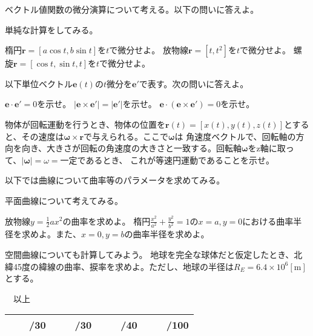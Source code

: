 \documentclass[a4j,dvipdfmx]{jsarticle}
\begin{document}
        ベクトル値関数の微分演算について考える。以下の問いに答えよ。
        \begin{qparts}
            \qpart 単純な計算をしてみる。
            \begin{qlist}
                \qitem 楕円$\bm{r}=[a\cos t,b\sin t]$を$t$で微分せよ。
                \qitem 放物線$\bm{r}=[t,t^2]$を$t$で微分せよ。
                \qitem 螺旋$\bm{r}=[\cos t,\sin t,t]$を$t$で微分せよ。
            \end{qlist}
            \qpart 以下単位ベクトル$\bm{e}(t)$の$t$微分を$\bm{e}'$で表す。次の問いに答えよ。
            \begin{qlist}
                \qitem $\bm{e}\cdot\bm{e}'=0$を示せ。
                \qitem $|\bm{e}\times\bm{e}'|=|\bm{e}'|$を示せ。
                \qitem $\bm{e}\cdot(\bm{e}\times\bm{e}')=0$を示せ。
            \end{qlist}
            \qpart 物体が回転運動を行うとき、物体の位置を$\bm{r}(t)=[x(t),y(t),z(t)]$とすると、その速度は$\bm{\omega}\times\bm{r}$で与えられる。ここで$\bm{\omega}$は
            角速度ベクトルで、回転軸の方向を向き、大きさが回転の角速度の大きさと一致する。回転軸$\bm{\omega}$をz軸に取って、$|\bm{\omega}|=\omega=一定$であるとき、
            これが等速円運動であることを示せ。
        \end{qparts}
    \clearpage
        以下では曲線について曲率等のパラメータを求めてみる。
        \begin{qparts}
            \qpart 平面曲線について考えてみる。
            \begin{qlist}
                \qitem 放物線$\displaystyle y=\frac{1}{2}ax^2$の曲率を求めよ。\vspace{0.5mm}
                \qitem 楕円$\displaystyle \frac{x^2}{a^2}+\frac{y^2}{b^2}=1$の$x=a,y=0$における曲率半径を求めよ。また、$x=0,y=b$の曲率半径を求めよ。
            \end{qlist}
            \qpart 空間曲線についても計算してみよう。
            地球を完全な球体だと仮定したとき、北緯45度の緯線の曲率、捩率を求めよ。ただし、地球の半径は$R_E=6.4\times10^6[\si{\meter}]$とする。
        \end{qparts}
    \hrulefill 　以上　\hrulefill
    \begin{table}[h]
        \centering
        \begin{tabular}{|c|c|c||c|}\hline
            　　/30 & 　　/30 & 　　/40 & 　　/100\\\hline
        \end{tabular}
    \end{table}
\end{document}

